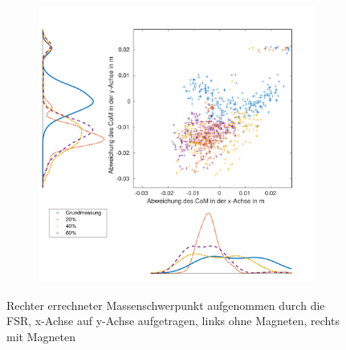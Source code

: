 \begin{figure}[tb]
\begin{adjustwidth}{-0.2\linewidth}{-0.2\linewidth}
\begin{subfigure}[c]{.45\linewidth}
			\includegraphics[width=\linewidth]{Bilder/rechts_CoM_mitM.pdf}
			\vspace{5pt}
		\end{subfigure}
	\end{adjustwidth}
	\caption{Rechter errechneter Massenschwerpunkt aufgenommen durch die FSR, x-Achse auf y-Achse aufgetragen, links ohne Magneten, rechts mit Magneten} \label{CoM_rechts}
\end{figure}

